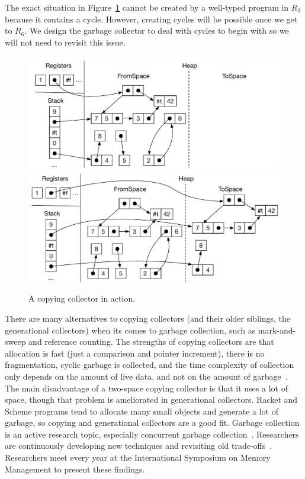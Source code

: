 \documentclass[11pt]{book}
\begin{document}
The exact situation in Figure~\ref{fig:copying-collector} cannot be
created by a well-typed program in $R_3$ because it contains a
cycle. However, creating cycles will be possible once we get to $R_6$.
We design the garbage collector to deal with cycles to begin with so
we will not need to revisit this issue.

\begin{figure}[tbp]
\centering
\includegraphics[width=\textwidth]{figs/copy-collect-1} \\[5ex]
\includegraphics[width=\textwidth]{figs/copy-collect-2}
\caption{A copying collector in action.}
\label{fig:copying-collector}
\end{figure}

There are many alternatives to copying collectors (and their older
siblings, the generational collectors) when its comes to garbage
collection, such as mark-and-sweep and reference counting.  The
strengths of copying collectors are that allocation is fast (just a
comparison and pointer increment), there is no fragmentation, cyclic
garbage is collected, and the time complexity of collection only
depends on the amount of live data, and not on the amount of
garbage~\citep{Wilson:1992fk}. The main disadvantage of a two-space
copying collector is that it uses a lot of space, though that problem
is ameliorated in generational collectors.  Racket and Scheme programs
tend to allocate many small objects and generate a lot of garbage, so
copying and generational collectors are a good fit.  Garbage
collection is an active research topic, especially concurrent garbage
collection~\citep{Tene:2011kx}. Researchers are continuously
developing new techniques and revisiting old
trade-offs~\citep{Blackburn:2004aa,Jones:2011aa,Shahriyar:2013aa,Cutler:2015aa,Shidal:2015aa,Osterlund:2016aa,Jacek:2019aa,Gamari:2020aa}. Researchers
meet every year at the International Symposium on Memory Management to
present these findings.
\end{document}
